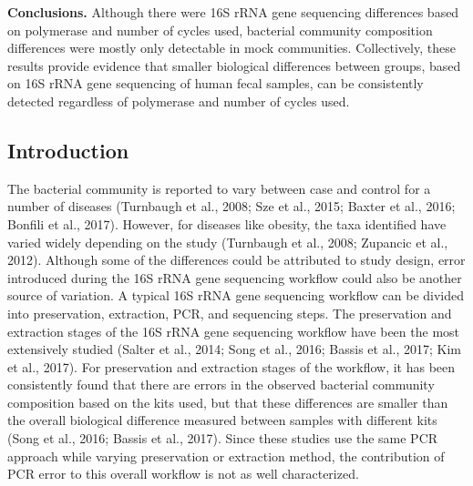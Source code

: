 \documentclass[11pt,]{article}
\begin{document}
\textbf{Conclusions.} Although there were 16S rRNA gene sequencing
differences based on polymerase and number of cycles used, bacterial
community composition differences were mostly only detectable in mock
communities. Collectively, these results provide evidence that smaller
biological differences between groups, based on 16S rRNA gene sequencing
of human fecal samples, can be consistently detected regardless of
polymerase and number of cycles used.

\newpage

\subsection{Introduction}\label{introduction}

The bacterial community is reported to vary between case and control for
a number of diseases (Turnbaugh et al., 2008; Sze et al., 2015; Baxter
et al., 2016; Bonfili et al., 2017). However, for diseases like obesity,
the taxa identified have varied widely depending on the study (Turnbaugh
et al., 2008; Zupancic et al., 2012). Although some of the differences
could be attributed to study design, error introduced during the 16S
rRNA gene sequencing workflow could also be another source of variation.
A typical 16S rRNA gene sequencing workflow can be divided into
preservation, extraction, PCR, and sequencing steps. The preservation
and extraction stages of the 16S rRNA gene sequencing workflow have been
the most extensively studied (Salter et al., 2014; Song et al., 2016;
Bassis et al., 2017; Kim et al., 2017). For preservation and extraction
stages of the workflow, it has been consistently found that there are
errors in the observed bacterial community composition based on the kits
used, but that these differences are smaller than the overall biological
difference measured between samples with different kits (Song et al.,
2016; Bassis et al., 2017). Since these studies use the same PCR
approach while varying preservation or extraction method, the
contribution of PCR error to this overall workflow is not as well
characterized.
\end{document}
